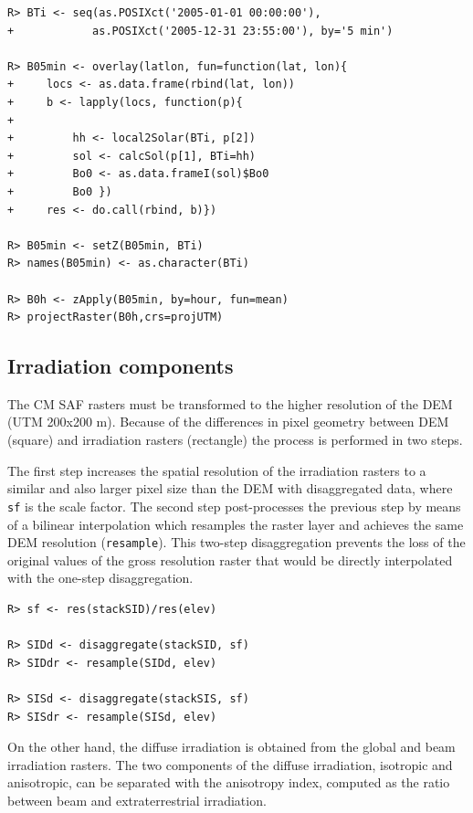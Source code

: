 \documentclass[11pt, english]{article}
\begin{document}
\lstset{language=R,numbers=none}
\begin{lstlisting} 
R> BTi <- seq(as.POSIXct('2005-01-01 00:00:00'),
+            as.POSIXct('2005-12-31 23:55:00'), by='5 min')

R> B05min <- overlay(latlon, fun=function(lat, lon){
+     locs <- as.data.frame(rbind(lat, lon))
+     b <- lapply(locs, function(p){
+ 
+         hh <- local2Solar(BTi, p[2])
+         sol <- calcSol(p[1], BTi=hh)
+         Bo0 <- as.data.frameI(sol)$Bo0
+         Bo0 })
+     res <- do.call(rbind, b)})

R> B05min <- setZ(B05min, BTi)
R> names(B05min) <- as.character(BTi)

R> B0h <- zApply(B05min, by=hour, fun=mean)
R> projectRaster(B0h,crs=projUTM)
\end{lstlisting}

\subsection{Irradiation components}
\label{sec-1-4}

The CM SAF rasters must be transformed to the higher resolution of the
DEM (UTM 200x200 m). Because of the differences in pixel geometry
between DEM (square) and irradiation rasters (rectangle) the process
is performed in two steps.

The first step increases the spatial resolution of the irradiation
rasters to a similar and also larger pixel size than the DEM with
disaggregated data, where \texttt{sf} is the scale factor. The second
step post-processes the previous step by means of a bilinear
interpolation which resamples the raster layer and achieves the same
DEM resolution (\texttt{resample}). This two-step disaggregation
prevents the loss of the original values of the gross resolution
raster that would be directly interpolated with the one-step
disaggregation.

\lstset{language=R,numbers=none}
\begin{lstlisting} 
R> sf <- res(stackSID)/res(elev)

R> SIDd <- disaggregate(stackSID, sf)
R> SIDdr <- resample(SIDd, elev)

R> SISd <- disaggregate(stackSIS, sf)
R> SISdr <- resample(SISd, elev)
\end{lstlisting}

On the other hand, the diffuse irradiation is obtained from the global
and beam irradiation rasters. The two components of the diffuse
irradiation, isotropic and anisotropic, can be separated with the
anisotropy index, computed as the ratio between beam and
extraterrestrial irradiation.
\end{document}

